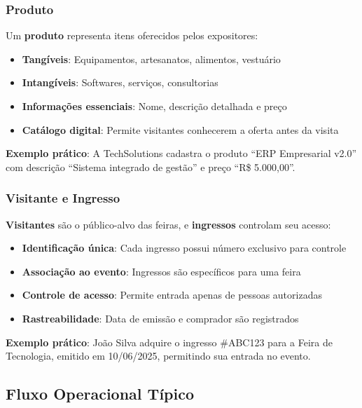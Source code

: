 \documentclass[12pt,a4paper]{article}
\begin{document}
\subsubsection{Produto}
Um \textbf{produto} representa itens oferecidos pelos expositores:
\begin{itemize}
    \item \textbf{Tangíveis}: Equipamentos, artesanatos, alimentos, vestuário
    \item \textbf{Intangíveis}: Softwares, serviços, consultorias
    \item \textbf{Informações essenciais}: Nome, descrição detalhada e preço
    \item \textbf{Catálogo digital}: Permite visitantes conhecerem a oferta antes da visita
\end{itemize}

\textbf{Exemplo prático}: A TechSolutions cadastra o produto ``ERP Empresarial v2.0'' com descrição ``Sistema integrado de gestão'' e preço ``R\$ 5.000,00''.

\subsubsection{Visitante e Ingresso}
\textbf{Visitantes} são o público-alvo das feiras, e \textbf{ingressos} controlam seu acesso:
\begin{itemize}
    \item \textbf{Identificação única}: Cada ingresso possui número exclusivo para controle
    \item \textbf{Associação ao evento}: Ingressos são específicos para uma feira
    \item \textbf{Controle de acesso}: Permite entrada apenas de pessoas autorizadas
    \item \textbf{Rastreabilidade}: Data de emissão e comprador são registrados
\end{itemize}

\textbf{Exemplo prático}: João Silva adquire o ingresso \#ABC123 para a Feira de Tecnologia, emitido em 10/06/2025, permitindo sua entrada no evento.

\subsection{Fluxo Operacional Típico}
\end{document}
